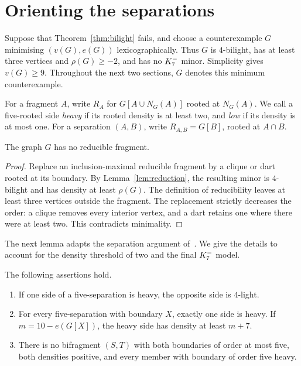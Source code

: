 \section{Orienting the separations}
\label{sec:global-orientations}

Suppose that Theorem~\ref{thm:bilight} fails, and choose a
counterexample $G$ minimising $(v(G),e(G))$ lexicographically. Thus $G$
is $4$-bilight, has at least three vertices and $\rho(G)\geq-2$, and
has no $K_7^{-}$ minor. Simplicity gives $v(G)\geq9$. Throughout the
next two sections, $G$ denotes this minimum counterexample.

For a fragment $A$, write $R_A$ for $G[A\cup N_G(A)]$ rooted at
$N_G(A)$. We call a five-rooted side \emph{heavy} if its rooted
density is at least two, and \emph{low} if its density is at most one.
For a separation $(A,B)$, write $R_{A,B}=G[B]$, rooted at $A\cap B$.

\begin{lemma}\label{gl:reducible}
The graph $G$ has no reducible fragment.
\end{lemma}

\begin{proof}
Replace an inclusion-maximal reducible fragment by a clique or dart
rooted at its boundary. By Lemma~\ref{lem:reduction}, the resulting
minor is $4$-bilight and has density at least $\rho(G)$. The
definition of reducibility leaves at least three vertices outside the
fragment. The replacement strictly decreases the order: a clique
removes every interior vertex, and a dart retains one where there were
at least two. This contradicts minimality.
\end{proof}

The next lemma adapts the separation argument
of~\cite[Section~5]{DNR2026}. We give the details to account for
the density threshold of two and the final $K_7^{-}$ model.

\begin{lemma}\label{gl:orientations}
The following assertions hold.
\begin{enumerate}
\item If one side of a five-separation is heavy, the opposite side
is $4$-light.
\item For every five-separation with boundary $X$, exactly one side
is heavy. If $m=10-e(G[X])$, the heavy side has density at least $m+7$.
\item There is no bifragment $(S,T)$ with both boundaries of order
at most five, both densities positive, and every member with boundary
of order five heavy.
\end{enumerate}
\end{lemma}

